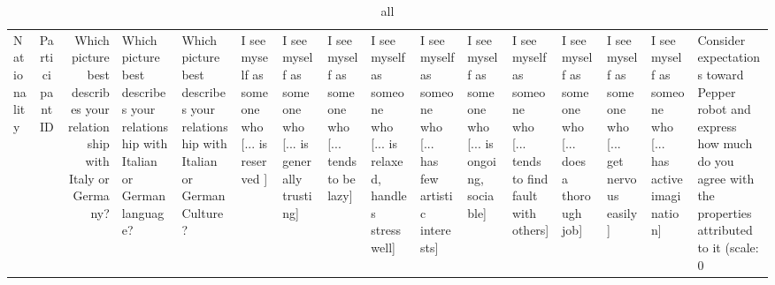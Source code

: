 \begin{table}
\caption{all}
\label{tab:all}
\begin{tabular}{lcr}
\toprule
Nationality & Participant ID & Which picture best describes your relationship with Italy or Germany? & Which picture best describes your relationship with Italian or German language? & Which picture best describes your relationship with Italian or German Culture? & I see myself as someone who  [... is reserved ] & I see myself as someone who  [... is generally trusting] & I see myself as someone who  [... tends to be lazy] & I see myself as someone who  [... is relaxed, handles stress well] & I see myself as someone who  [... has few artistic interests] & I see myself as someone who  [... is ongoing, sociable] & I see myself as someone who  [... tends to find fault with others] & I see myself as someone who  [... does a thorough job] & I see myself as someone who  [... get nervous easily] & I see myself as someone who  [... has active imagination] & Consider expectations toward Pepper robot and express how much do you agree with the properties attributed to it (scale: 0%
\end{tabular}
\end{table}
